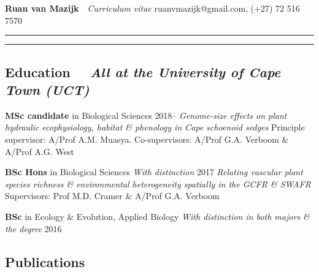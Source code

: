 \documentclass[10pt]{article}
\begin{document}
{\huge \textbf{Ruan van Mazijk}}~~{\Large \textit{Curriculum vitae}} \hfill
ruanvmazijk@gmail.com, (+27) 72 516 7570

\vskip10pt \hrule \vskip2pt \hrule

\subsection*{Education %
  ~~{\small \textmd{\textit{All at the University of Cape Town (UCT)}}}}

\begin{hangparas}{2em}{1}

\textbf{MSc candidate} in Biological Sciences      \hfill {\small 2018--} \break
\textit{Genome-size effects on plant hydraulic ecophysiology, habitat \&
  phenology in Cape schoenoid sedges} \break
Principle supervisor: A/Prof A.M. Muasya. Co-supervisors: A/Prof G.A. Verboom
  \& A/Prof A.G. West

\textbf{BSc Hons} in Biological Sciences {\small \textit{With distinction}}                                                     \hfill {\small 2017} \break
\textit{Relating vascular plant species richness \& environmental heterogeneity
  spatially in the GCFR \& SWAFR} \break
Supervisors: Prof M.D. Cramer \& A/Prof G.A. Verboom

\textbf{BSc} in Ecology \& Evolution, Applied Biology {\small \textit{With
  distinction in both majors \& the degree}}         \hfill {\small 2016} \break
\hfill

\end{hangparas}

\subsection*{Publications} %

\begin{hangparas}{2em}{1}

\hrulefill
\end{hangparas}
\end{document}
